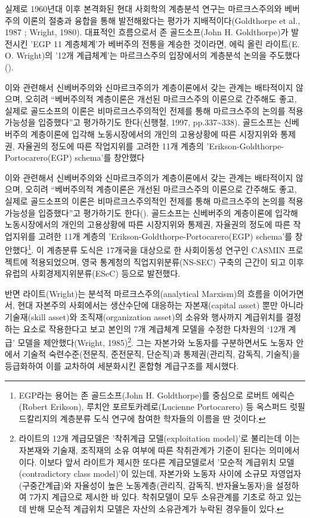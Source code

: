 \documentclass[
  letterpaper,
  DIV=11,
  numbers=noendperiod]{scrartcl}
\begin{document}
실제로 1960년대 이후 본격화된 현대 사회학의 계층분석 연구는
마르크스주의와 베버주의 이론의 절충과 융합을 통해 발전해왔다는 평가가
지배적이다(Goldthorpe et al., 1987 ; Wright, 1980). 대표적인 흐름으로서
존 골드소프(John H. Goldthorpe)가 발전시킨 'EGP 11 계층체계'가 베버주의
전통을 계승한 것이라면, 에릭 올린 라이트(E. O. Wright)의 '12개
계급체계'는 마르크스주의 입장에서의 계층분석 논의을
주도했다().

이와 관련해서 신베버주의와 신마르크주의가 계층이론에서 갖는 관계는
배타적이지 않으며, 오히려 ``베버주의적 계층이론은 개선된 마르크스주의
이론으로 간주해도 좋고, 실제로 골드소프의 이론은 비마르크스주의적인
전제를 통해 마르크스주의 논의를 적용가능성을 입증했다''고 평가하기도
한다(신행철, 1997, pp.337\textasciitilde338). 골드소프는 신베버주의
계층이론에 입각해 노동시장에서의 개인의 고용상황에 따른 시장지위와
통제권, 자율권의 정도에 따른 작업지위를 고려한 11개 계층의
'Erikson-Goldthorpe-Portocarero(EGP) schema'를 창안했다

이와 관련해서 신베버주의와 신마르크주의가 계층이론에서 갖는 관계는
배타적이지 않으며, 오히려 ``베버주의적 계층이론은 개선된 마르크스주의
이론으로 간주해도 좋고, 실제로 골드소프의 이론은 비마르크스주의적인
전제를 통해 마르크스주의 논의를 적용가능성을 입증했다''고 평가하기도
한다(). 골드소프는 신베버주의 계층이론에 입각해
노동시장에서의 개인의 고용상황에 따른 시장지위와 통제권, 자율권의 정도에
따른 작업지위를 고려한 11개 계층의 'Erikson-Goldthorpe-Portocarero(EGP)
schema'를 창안했다\footnote{EGP라는 용어는 존 골드소프(John H.
  Goldthorpe)를 중심으로 로버트 에릭슨(Robert Erikson), 루치안
  포르토카레로(Lucienne Portocarero) 등 옥스퍼드 럿필드칼리지의 계층분류
  도식 연구에 참여한 학자들의 이름을 딴 것이다.}. 이 계층분류 도식은
17개국을 대상으로 한 사회이동성 연구인 CASMIN 프로젝트에 적용되었으며,
영국 통계청의 직업지위분류(NS-SEC) 구축의 근간이 되고 이후 유럽의
사회경제지위분류(ESeC) 등으로 발전했다.

반면 라이트(Wright)는 분석적 마르크스주의(analytical Marxism)의 흐름을
이어가면서, 현대 자본주의 사회에서는 생산수단에 대응하는 자본재(capital
asset) 뿐만 아니라 기술재(skill asset)와 조직재(organization asset)의
소유와 행사까지 계급위치를 결정하는 요소로 작용한다고 보고 본인의 7개
계급체계 모델을 수정한 다차원의 `12개 계급' 모델을 제안했다(Wright,
1985)\footnote{라이트의 12개 계급모델은 '착취계급 모델(exploitation
  model)'로 불리는데 이는 자본재와 기술재, 조직재의 소유 여부에 따른
  착취관계가 기준이 된다는 의미에서이다. 이보다 앞서 라이트가 제시한
  또다른 계급모델로서 '모순적 계급위치 모델(contradictory class
  model)'이 있는데, 자본가와 노동자 사이에 소규모 자영업자(구중간계급)와
  자율성이 높은 노동계층(관리직, 감독직, 반자율노동자)을 설정하여 7가지
  계급으로 제시한 바 있다. 착취모델이 모두 소유관계를 기초로 하고 있는데
  반해 모순적 계급위치 모델은 자산의 소유관계가 누락된 경우들이 있다.}.
그는 자본가와 노동자를 구분하면서도 노동자 안에서 기술적
숙련수준(전문직, 준전문직, 단순직)과 통제권(관리직, 감독직, 기술직)을
등급화하여 이를 교차하여 세분화시킨 혼합형 계급구조를 제시했다.
\end{document}
